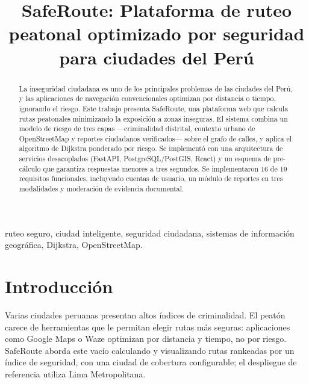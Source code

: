 \documentclass[conference]{IEEEtran}
\begin{document}
\title{SafeRoute: Plataforma de ruteo peatonal optimizado por seguridad para ciudades del Perú}

\author{
}

\maketitle

\begin{abstract}
La inseguridad ciudadana es uno de los principales problemas de las ciudades del Perú, y las aplicaciones de navegación convencionales optimizan por distancia o tiempo, ignorando el riesgo. Este trabajo presenta SafeRoute, una plataforma web que calcula rutas peatonales minimizando la exposición a zonas inseguras. El sistema combina un modelo de riesgo de tres capas ---criminalidad distrital, contexto urbano de OpenStreetMap y reportes ciudadanos verificados--- sobre el grafo de calles, y aplica el algoritmo de Dijkstra ponderado por riesgo. Se implementó con una arquitectura de servicios desacoplados (FastAPI, PostgreSQL/PostGIS, React) y un esquema de pre-cálculo que garantiza respuestas menores a tres segundos. Se implementaron 16 de 19 requisitos funcionales, incluyendo cuentas de usuario, un módulo de reportes en tres modalidades y moderación de evidencia documental.
\end{abstract}

\begin{IEEEkeywords}
ruteo seguro, ciudad inteligente, seguridad ciudadana, sistemas de información geográfica, Dijkstra, OpenStreetMap.
\end{IEEEkeywords}

\section{Introducción}
Varias ciudades peruanas presentan altos índices de criminalidad. El peatón carece de herramientas que le permitan elegir rutas más seguras: aplicaciones como Google Maps o Waze optimizan por distancia y tiempo, no por riesgo. SafeRoute aborda este vacío calculando y visualizando rutas rankeadas por un índice de seguridad, con una ciudad de cobertura configurable; el despliegue de referencia utiliza Lima Metropolitana.
\end{document}
